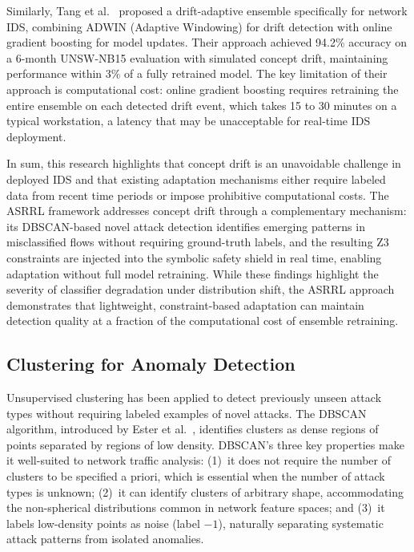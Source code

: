 \documentclass[12pt, letterpaper, oneside]{report}
\newcommand{\ASRRL}{\textsc{ASRRL}}
\begin{document}
Similarly, Tang et al.~\cite{tang2020} proposed a drift-adaptive ensemble specifically for network IDS, combining ADWIN (Adaptive Windowing) for drift detection with online gradient boosting for model updates. Their approach achieved 94.2\% accuracy on a 6-month UNSW-NB15 evaluation with simulated concept drift, maintaining performance within 3\% of a fully retrained model. The key limitation of their approach is computational cost: online gradient boosting requires retraining the entire ensemble on each detected drift event, which takes 15 to 30 minutes on a typical workstation, a latency that may be unacceptable for real-time IDS deployment.

In sum, this research highlights that concept drift is an unavoidable challenge in deployed IDS and that existing adaptation mechanisms either require labeled data from recent time periods or impose prohibitive computational costs. The \ASRRL{} framework addresses concept drift through a complementary mechanism: its DBSCAN-based novel attack detection identifies emerging patterns in misclassified flows without requiring ground-truth labels, and the resulting Z3 constraints are injected into the symbolic safety shield in real time, enabling adaptation without full model retraining. While these findings highlight the severity of classifier degradation under distribution shift, the \ASRRL{} approach demonstrates that lightweight, constraint-based adaptation can maintain detection quality at a fraction of the computational cost of ensemble retraining.

\subsection{Clustering for Anomaly Detection}

Unsupervised clustering has been applied to detect previously unseen attack types without requiring labeled examples of novel attacks. The DBSCAN algorithm, introduced by Ester et al.~\cite{ester1996}, identifies clusters as dense regions of points separated by regions of low density. DBSCAN's three key properties make it well-suited to network traffic analysis: (1)~it does not require the number of clusters to be specified a priori, which is essential when the number of attack types is unknown; (2)~it can identify clusters of arbitrary shape, accommodating the non-spherical distributions common in network feature spaces; and (3)~it labels low-density points as noise (label $-1$), naturally separating systematic attack patterns from isolated anomalies.
\end{document}

